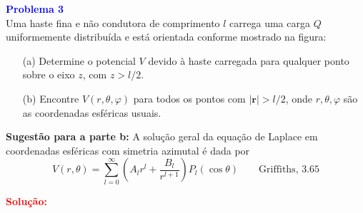 \documentclass[a4paper,12pt]{article}
\begin{document}
\begin{flushleft}
\textbf{\textcolor{blue}{\Large Problema 3}}\\

Uma haste fina e não condutora de comprimento \( l \) carrega uma carga 
\( Q \) uniformemente distribuída e está orientada conforme mostrado na figura:

\begin{center}
\end{center}

\begin{enumerate}
    \item[(a)] Determine o potencial \( V \) devido à haste carregada para qualquer 
    ponto sobre o eixo \( z \), com \( z > l/2 \).

    \item[(b)] Encontre \( V(r, \theta, \varphi) \) para todos os pontos com \( |\mathbf{r}| > l/2 \), 
    onde \( r, \theta, \varphi \) são as coordenadas esféricas usuais.
\end{enumerate}

\textbf{Sugestão para a parte b:} A solução geral da equação de Laplace em coordenadas esféricas 
com simetria azimutal é dada por
\begin{equation}
V(r, \theta) = \sum_{l=0}^{\infty} \left( A_l r^l + \frac{B_l}{r^{l+1}} \right) P_l(\cos\theta)
\qquad \text{Griffiths, 3.65}
\end{equation}

\textcolor{red}{\textbf{Solução:}}\\

\end{flushleft}
\end{document}
